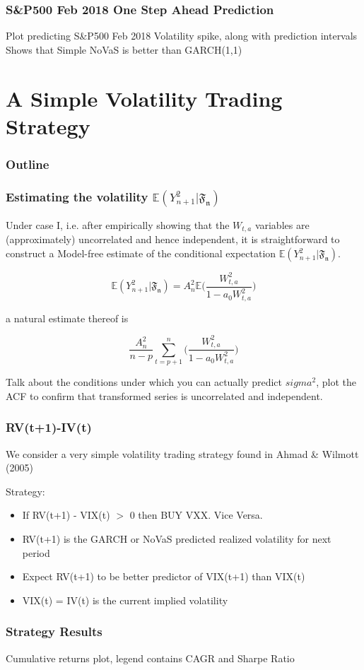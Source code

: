 \documentclass{beamer}
\begin{document}
\begin{frame}
\frametitle{S&P500 Feb 2018 One Step Ahead Prediction}
Plot predicting S&P500 Feb 2018 Volatility spike, along with prediction intervals
Shows that Simple NoVaS is better than GARCH(1,1)
\end{frame}

\section{A Simple Volatility Trading Strategy}

\begin{frame}
\frametitle{Outline}
\tableofcontents[currentsection]
\end{frame}

\begin{frame}
\frametitle{Estimating the volatility $\mathbb{E}(Y_{n+1}^2|\mathfrak{F_n})$
}

Under case I, i.e. after empirically showing that the $W_{t,a}$ variables are (approximately) uncorrelated and hence independent, it is straightforward to construct a Model-free estimate of the conditional expectation $\mathbb{E}(Y_{n+1}^2|\mathfrak{F_{n}})$.


$$\mathbb{E}(Y_{n+1}^2|\mathfrak{F_{n}}) = A_{n}^2 \mathbb{E} \bigg( \frac{W_{t,a}^2}{1-a_0 W_{t,a}^2} \bigg) $$

a natural estimate thereof is

$$ \frac{A_{n}^2}{n-p} \sum_{t=p+1}^{n} \bigg( \frac{W_{t,a}^2}{1-a_0 W_{t,a}^2} \bigg) $$

Talk about the conditions under which you can actually predict $sigma^2$, plot the ACF to confirm that transformed series is uncorrelated and independent.
\end{frame}

\begin{frame}
\frametitle{RV(t+1)-IV(t)}
We consider a very simple volatility trading strategy found in Ahmad & Wilmott (2005)

Strategy:
\begin{itemize}
\item{If RV(t+1) - VIX(t) $>$ 0 then BUY VXX. Vice Versa.}
\item{RV(t+1) is the GARCH or NoVaS predicted realized volatility for next period}
\item{Expect RV(t+1) to be better predictor of VIX(t+1) than VIX(t)}
\item{VIX(t) = IV(t) is the current implied volatility}
\end{itemize}
\end{frame}

\begin{frame}
\frametitle{Strategy Results}
Cumulative returns plot, legend contains CAGR and Sharpe Ratio
\end{frame}
\end{document}
